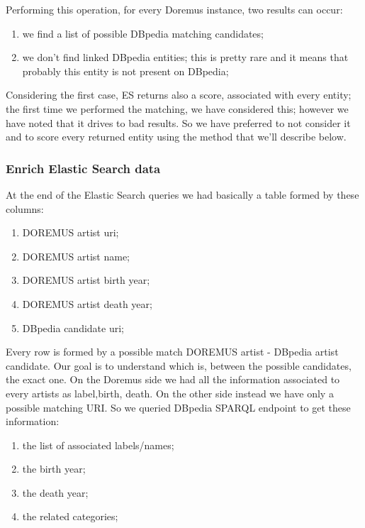 \documentclass[paper=a4, fontsize=11pt]{scrartcl}
\begin{document}
Performing this operation, for every Doremus instance, two results can occur:

\begin{enumerate}
\item we find a list of possible DBpedia matching candidates;
\item we don't find linked DBpedia entities; this is pretty rare and it means that probably this entity is not present on DBpedia;
\end{enumerate}

Considering the first case, ES returns also a score, associated with every entity; the first time we performed the matching, we have considered this; however we have noted that it drives to bad results. So we have preferred to not consider it and to score every returned entity using the method that we'll describe below.

\subsubsection{Enrich Elastic Search data}

At the end of the Elastic Search queries we had basically a table formed by these columns:

\begin{enumerate}

\item DOREMUS artist uri;

\item DOREMUS artist name;

\item DOREMUS artist birth year;

\item DOREMUS artist death year;

\item DBpedia candidate uri;

\end{enumerate}

Every row is formed by a possible match DOREMUS artist - DBpedia artist candidate.
Our goal is to understand which is, between the possible candidates, the exact one.
On the Doremus side we had all the information associated to every artists as label,birth, death. On the other side instead we have only a possible matching URI. So we queried DBpedia SPARQL endpoint to get these information:

\begin{enumerate}

\item the list of associated labels/names;

\item the birth year;

\item the death year;

\item the related categories;

\end{enumerate}
\end{document}
